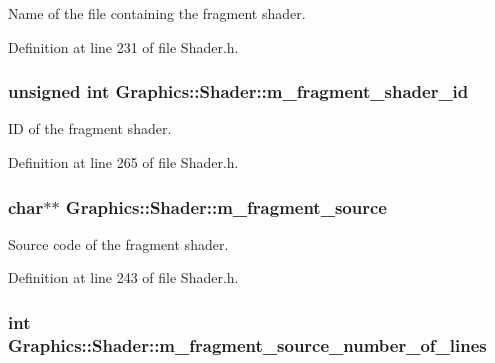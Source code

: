 Name of the file containing the fragment shader. 



Definition at line 231 of file Shader.h.

\hypertarget{class_graphics_1_1_shader_a64e39abd7b7f12eba636e0ab9941b450}{
\subsubsection[{m\_\-fragment\_\-shader\_\-id}]{\setlength{\rightskip}{0pt plus 5cm}unsigned int {\bf Graphics::Shader::m\_\-fragment\_\-shader\_\-id}}}
\label{class_graphics_1_1_shader_a64e39abd7b7f12eba636e0ab9941b450}


ID of the fragment shader. 



Definition at line 265 of file Shader.h.

\hypertarget{class_graphics_1_1_shader_a96b941618154e8d71223eb8af86a5dee}{
\subsubsection[{m\_\-fragment\_\-source}]{\setlength{\rightskip}{0pt plus 5cm}char$\ast$$\ast$ {\bf Graphics::Shader::m\_\-fragment\_\-source}}}
\label{class_graphics_1_1_shader_a96b941618154e8d71223eb8af86a5dee}


Source code of the fragment shader. 



Definition at line 243 of file Shader.h.

\hypertarget{class_graphics_1_1_shader_a4086155a5c6ac1c9b4983fb10f6c7418}{
\subsubsection[{m\_\-fragment\_\-source\_\-number\_\-of\_\-lines}]{\setlength{\rightskip}{0pt plus 5cm}int {\bf Graphics::Shader::m\_\-fragment\_\-source\_\-number\_\-of\_\-lines}}}
\label{class_graphics_1_1_shader_a4086155a5c6ac1c9b4983fb10f6c7418}


